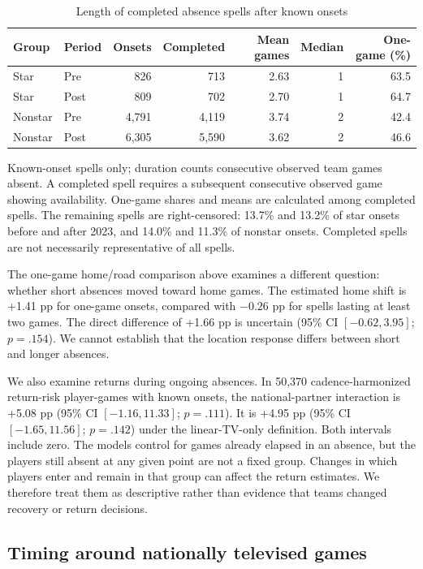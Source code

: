 \documentclass[11pt]{article}
\begin{document}
\begin{table}[!htbp]\centering
\caption{Length of completed absence spells after known onsets}\label{tab:duration}
\small\setlength{\tabcolsep}{3.5pt}
\begin{tabular}{@{}llrrrrr@{}}\toprule
Group & Period & Onsets & Completed & Mean games & Median & One-game (\%)\\\midrule
Star & Pre & 826 & 713 & 2.63 & 1 & 63.5\\
Star & Post & 809 & 702 & 2.70 & 1 & 64.7\\
Nonstar & Pre & 4,791 & 4,119 & 3.74 & 2 & 42.4\\
Nonstar & Post & 6,305 & 5,590 & 3.62 & 2 & 46.6\\\bottomrule
\end{tabular}\par\smallskip\raggedright\footnotesize
Known-onset spells only; duration counts consecutive observed team games absent. A completed spell requires a subsequent consecutive observed game showing availability. One-game shares and means are calculated among completed spells. The remaining spells are right-censored: 13.7\% and 13.2\% of star onsets before and after 2023, and 14.0\% and 11.3\% of nonstar onsets. Completed spells are not necessarily representative of all spells.
\end{table}

The one-game home/road comparison above examines a different question: whether short absences moved toward home games. The estimated home shift is +1.41 pp for one-game onsets, compared with $-0.26$ pp for spells lasting at least two games. The direct difference of +1.66 pp is uncertain (95\% CI $[-0.62,3.95]$; $p=.154$). We cannot establish that the location response differs between short and longer absences.

We also examine returns during ongoing absences. In 50,370 cadence-harmonized return-risk player-games with known onsets, the national-partner interaction is +5.08 pp (95\% CI $[-1.16,11.33]$; $p=.111$). It is +4.95 pp (95\% CI $[-1.65,11.56]$; $p=.142$) under the linear-TV-only definition. Both intervals include zero. The models control for games already elapsed in an absence, but the players still absent at any given point are not a fixed group. Changes in which players enter and remain in that group can affect the return estimates. We therefore treat them as descriptive rather than evidence that teams changed recovery or return decisions.

\subsection{Timing around nationally televised games}
\end{document}
